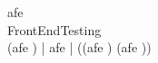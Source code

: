 \begin{circus}
\circchannel afe \\
\circprocess FrontEndTesting \circdef \circbegin \\
	\circspot (afe \then \Skip) \lpar | \lchanset afe \rchanset | \rpar ((afe \then \Skip) \interleave (afe \then \Skip)) \\
\circend \\
\end{circus}
